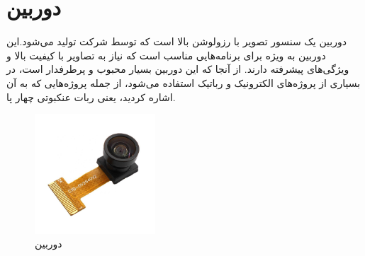 \section{دوربین }
دوربین  یک سنسور تصویر  با رزولوشن بالا است که توسط شرکت  تولید می‌شود.این دوربین به ویژه برای برنامه‌هایی مناسب است که نیاز به تصاویر با کیفیت بالا و ویژگی‌های پیشرفته دارند. از آنجا که این دوربین بسیار محبوب و پرطرفدار است، در بسیاری از پروژه‌های الکترونیک و رباتیک استفاده می‌شود، از جمله پروژه‌هایی که به آن اشاره کردید، یعنی ربات عنکبوتی چهار پا.


\begin{figure}[h]
	\centering
	\includegraphics[width=0.4\textwidth]{./images/Chapter4/OV2640}
	\caption[دوربین ]{دوربین  \cite{OV2640}}
	\label{عکس دوربین}
\end{figure}

